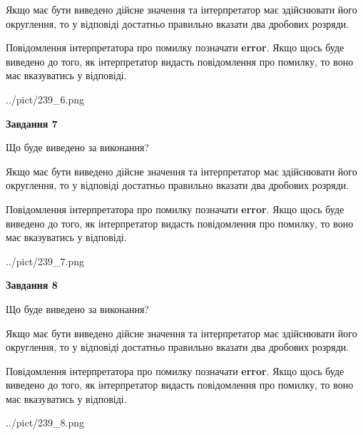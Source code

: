 \documentclass[12pt, ukrainian]{article}
\begin{document}
{\begin {Large}
Якщо має бути виведено дійсне значення та інтерпретатор має здійснювати його округлення, 
то у відповіді достатньо правильно вказати два дробових розряди.

Повідомлення інтерпретатора про помилку позначати \textbf{error}.
Якщо щось буде виведено до того, як інтерпретатор видасть повідомлення про помилку, 
то воно має вказуватись у відповіді. \par

\begin{center}
	{../pict/239_6.png}
\end{center}
\newpage

{\begin {center}\textbf{Завдання 7}\end {center}}\par
Що буде виведено за виконання? \par

Якщо має бути виведено дійсне значення та інтерпретатор має здійснювати його округлення, 
то у відповіді достатньо правильно вказати два дробових розряди.

Повідомлення інтерпретатора про помилку позначати \textbf{error}.
Якщо щось буде виведено до того, як інтерпретатор видасть повідомлення про помилку, 
то воно має вказуватись у відповіді. \par

\begin{center}
	{../pict/239_7.png}
\end{center}
\newpage

{\begin {center}\textbf{Завдання 8}\end {center}}\par
Що буде виведено за виконання? \par

Якщо має бути виведено дійсне значення та інтерпретатор має здійснювати його округлення, 
то у відповіді достатньо правильно вказати два дробових розряди.

Повідомлення інтерпретатора про помилку позначати \textbf{error}.
Якщо щось буде виведено до того, як інтерпретатор видасть повідомлення про помилку, 
то воно має вказуватись у відповіді. \par

\begin{center}
	{../pict/239_8.png}
\end{center}
\newpage


\end{Large}}
\end{document}
